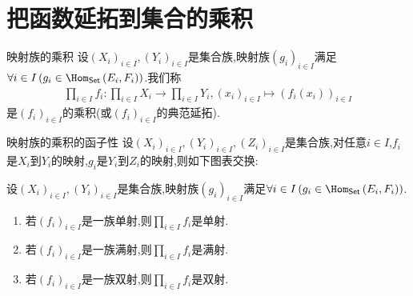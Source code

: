 \section{把函数延拓到集合的乘积}

\begin{definition}{映射族的乘积}{}
	设$\left(X_{i}\right)_{i\in I},\left(Y_{i}\right)_{i\in I}$是集合族,映射族$\left(g_{i}\right)_{i\in I}$满足$\forall i\in I\left(g_{i}\in\Hom_{\mathsf{Set}}\left(E_{i},F_{i}\right)\right)$.我们称
	\begin{align*}
		\prod\limits_{i\in I}f_{i}:\prod\limits_{i\in I}X_{i}\to\prod\limits_{i\in I}Y_{i},\left(x_{i}\right)_{i\in I}\mapsto\left(f_{i}\left(x_{i}\right)\right)_{i\in I}
	\end{align*}
	是$\left(f_{i}\right)_{i\in I}$的乘积(或$\left(f_{i}\right)_{i\in I}$的典范延拓).
\end{definition}

\begin{proposition}{映射族的乘积的函子性}{}
	设$\left(X_{i}\right)_{i\in I},\left(Y_{i}\right)_{i\in I},\left(Z_{i}\right)_{i\in I}$是集合族,对任意$i\in I$,$f_{i}$是$X_{i}$到$Y_{i}$的映射,$g_{i}$是$Y_{i}$到$Z_{i}$的映射,则如下图表交换:
	\begin{center}
	\end{center}
\end{proposition}

\begin{corollary}{}{}
	设$\left(X_{i}\right)_{i\in I},\left(Y_{i}\right)_{i\in I}$是集合族,映射族$\left(g_{i}\right)_{i\in I}$满足$\forall i\in I\left(g_{i}\in\Hom_{\mathsf{Set}}\left(E_{i},F_{i}\right)\right)$.
	\begin{enumerate}
		\item 若$\left(f_{i}\right)_{i\in I}$是一族单射,则$\prod\limits_{i\in I}f_{i}$是单射.
		\item 若$\left(f_{i}\right)_{i\in I}$是一族满射,则$\prod\limits_{i\in I}f_{i}$是满射.
		\item 若$\left(f_{i}\right)_{i\in I}$是一族双射,则$\prod\limits_{i\in I}f_{i}$是双射.
	\end{enumerate}
\end{corollary}

